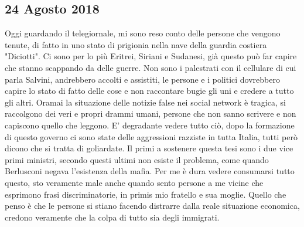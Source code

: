\subsection{24 Agosto 2018}
Oggi guardando il telegiornale, mi sono reso conto delle persone che vengono tenute, di fatto in uno stato di prigionia nella nave della guardia costiera "Diciotti". Ci sono per lo più Eritrei, Siriani e Sudanesi, già questo può far capire che stanno scappando da delle guerre. Non sono i palestrati con il cellulare di cui parla Salvini, andrebbero accolti e assistiti, le persone e i politici dovrebbero capire lo stato di fatto delle cose e non raccontare bugie gli uni e credere a tutto gli altri. Oramai la situazione delle notizie false nei social network è tragica, si raccolgono dei veri e propri drammi umani, persone che non sanno scrivere e non capiscono quello che leggono.\newline
E' degradante vedere tutto ciò, dopo la formazione di questo governo ci sono state delle aggressioni razziste in tutta Italia, tutti però dicono che si tratta di goliardate. Il primi a sostenere questa tesi sono i due vice primi ministri, secondo questi ultimi non esiste il problema, come quando Berlusconi negava l'esistenza della mafia. Per me è dura vedere consumarsi tutto questo, sto veramente male anche quando sento persone a me vicine che esprimono frasi discriminatorie, in primis mio fratello e sua moglie. Quello che penso è che le persone si stiano facendo distrarre dalla reale situazione economica, credono veramente che la colpa di tutto sia degli immigrati.\newline